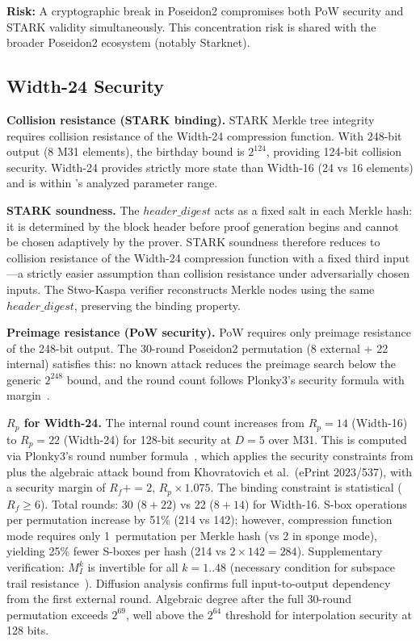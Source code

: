 \documentclass[11pt,a4paper]{article}
\begin{document}
\textbf{Risk:} A cryptographic break in Poseidon2 compromises both PoW security and STARK validity simultaneously. This concentration risk is shared with the broader Poseidon2 ecosystem (notably Starknet).

\subsection{Width-24 Security}
\label{sec:width24sec}

\textbf{Collision resistance (STARK binding).} STARK Merkle tree integrity requires collision resistance of the Width-24 compression function. With 248-bit output (8 M31 elements), the birthday bound is $2^{124}$, providing 124-bit collision security. Width-24 provides strictly more state than Width-16 (24 vs 16 elements) and is within \cite{poseidon2}'s analyzed parameter range.

\textbf{STARK soundness.} The $\mathit{header\_digest}$ acts as a fixed salt in each Merkle hash: it is determined by the block header before proof generation begins and cannot be chosen adaptively by the prover. STARK soundness therefore reduces to collision resistance of the Width-24 compression function with a fixed third input---a strictly easier assumption than collision resistance under adversarially chosen inputs. The Stwo-Kaspa verifier reconstructs Merkle nodes using the same $\mathit{header\_digest}$, preserving the binding property.

\textbf{Preimage resistance (PoW security).} PoW requires only preimage resistance of the 248-bit output. The 30-round Poseidon2 permutation (8 external + 22 internal) satisfies this: no known attack reduces the preimage search below the generic $2^{248}$ bound, and the round count follows Plonky3's security formula with margin~\cite{plonky3}.

\textbf{$R_p$ for Width-24.} The internal round count increases from $R_p = 14$ (Width-16) to $R_p = 22$ (Width-24) for 128-bit security at $D = 5$ over M31. This is computed via Plonky3's round number formula~\cite{plonky3}, which applies the security constraints from \cite{poseidon,poseidon2} plus the algebraic attack bound from Khovratovich et al.\ (ePrint 2023/537), with a security margin of $R_f \mathrel{{+}{=}} 2$, $R_p \times 1.075$. The binding constraint is statistical ($R_f \geq 6$). Total rounds: 30 ($8 + 22$) vs 22 ($8 + 14$) for Width-16. S-box operations per permutation increase by 51\% (214 vs 142); however, compression function mode requires only 1~permutation per Merkle hash (vs 2 in sponge mode), yielding 25\% fewer S-boxes per hash (214 vs $2 \times 142 = 284$). Supplementary verification: $M_I^k$ is invertible for all $k = 1..48$ (necessary condition for subspace trail resistance~\cite{poseidon2}). Diffusion analysis confirms full input-to-output dependency from the first external round. Algebraic degree after the full 30-round permutation exceeds $2^{69}$, well above the $2^{64}$ threshold for interpolation security at 128 bits.
\end{document}
